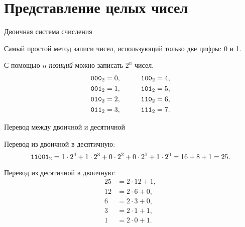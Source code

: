 \section{Представление целых чисел}

\begin{frame}{Двоичная система счисления}

  Самый простой метод записи чисел, использующий только две цифры: 0 и 1.

  С помощью $n$ \emph{позиций} можно записать $2^n$ чисел.
  \begin{align*}
    \mathtt{000}_2 &= 0, &\qquad \mathtt{100}_2 &= 4, \\
    \mathtt{001}_2 &= 1, &\qquad \mathtt{101}_2 &= 5, \\
    \mathtt{010}_2 &= 2, &\qquad \mathtt{110}_2 &= 6, \\
    \mathtt{011}_2 &= 3, &\qquad \mathtt{111}_2 &= 7.
  \end{align*}
\end{frame}

\begin{frame}{Перевод между двоичной и десятичной}

  Перевод из двоичной в десятичную:
  \[
    \mathtt{11001}_2 = 1 \cdot 2^4 + 1 \cdot 2^3 +
                  0 \cdot 2^2 + 0 \cdot 2^1 +
                  1 \cdot 2^0 = 16 + 8 + 1 = 25.
  \]

  Перевод из десятичной в двоичную:
  \begin{align*}
    25 &= 2 \cdot 12 + 1, \\
    12 &= 2 \cdot 6 + 0, \\
    6 &= 2 \cdot 3 + 0, \\
    3 &= 2 \cdot 1 + 1, \\
    1 &= 2 \cdot 0 + 1.
  \end{align*}

\end{frame}

